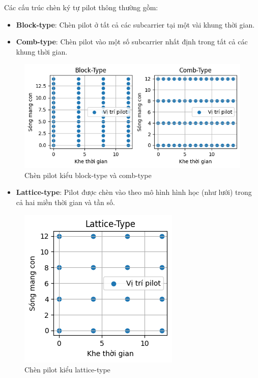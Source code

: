 Các cấu trúc chèn ký tự pilot thông thường gồm:

\begin{itemize}
    \item \textbf{Block-type}: Chèn pilot ở tất cả các subcarrier tại một vài khung thời gian.
    \item \textbf{Comb-type}: Chèn pilot vào một số subcarrier nhất định trong tất cả các khung thời gian.
\end{itemize}

\begin{figure}[H]
    \centering
    \includegraphics[width=.8\linewidth]{../images/pilot_block_comb.png}
    \caption{Chèn pilot kiểu block-type và comb-type}
\end{figure}

\begin{itemize}
    \item \textbf{Lattice-type}: Pilot được chèn vào theo mô hình hình học (như lưới) trong cả hai miền thời gian và tần số.
\end{itemize}

\begin{figure}[H]
    \centering
    \includegraphics[width=.4\linewidth]{../images/pilot_lattice.png}
    \caption{Chèn pilot kiểu lattice-type}
\end{figure}